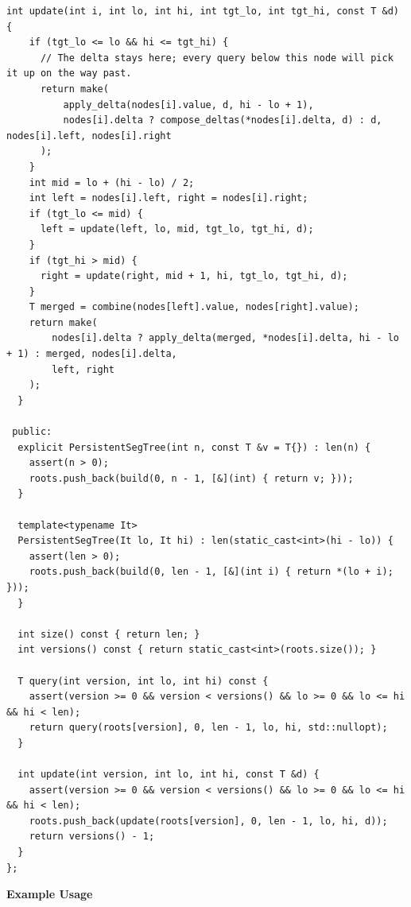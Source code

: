 \begin{lstlisting}[style=cpp]
  int update(int i, int lo, int hi, int tgt_lo, int tgt_hi, const T &d) {
    if (tgt_lo <= lo && hi <= tgt_hi) {
      // The delta stays here; every query below this node will pick it up on the way past.
      return make(
          apply_delta(nodes[i].value, d, hi - lo + 1),
          nodes[i].delta ? compose_deltas(*nodes[i].delta, d) : d, nodes[i].left, nodes[i].right
      );
    }
    int mid = lo + (hi - lo) / 2;
    int left = nodes[i].left, right = nodes[i].right;
    if (tgt_lo <= mid) {
      left = update(left, lo, mid, tgt_lo, tgt_hi, d);
    }
    if (tgt_hi > mid) {
      right = update(right, mid + 1, hi, tgt_lo, tgt_hi, d);
    }
    T merged = combine(nodes[left].value, nodes[right].value);
    return make(
        nodes[i].delta ? apply_delta(merged, *nodes[i].delta, hi - lo + 1) : merged, nodes[i].delta,
        left, right
    );
  }

 public:
  explicit PersistentSegTree(int n, const T &v = T{}) : len(n) {
    assert(n > 0);
    roots.push_back(build(0, n - 1, [&](int) { return v; }));
  }

  template<typename It>
  PersistentSegTree(It lo, It hi) : len(static_cast<int>(hi - lo)) {
    assert(len > 0);
    roots.push_back(build(0, len - 1, [&](int i) { return *(lo + i); }));
  }

  int size() const { return len; }
  int versions() const { return static_cast<int>(roots.size()); }

  T query(int version, int lo, int hi) const {
    assert(version >= 0 && version < versions() && lo >= 0 && lo <= hi && hi < len);
    return query(roots[version], 0, len - 1, lo, hi, std::nullopt);
  }

  int update(int version, int lo, int hi, const T &d) {
    assert(version >= 0 && version < versions() && lo >= 0 && lo <= hi && hi < len);
    roots.push_back(update(roots[version], 0, len - 1, lo, hi, d));
    return versions() - 1;
  }
};
\end{lstlisting}
\textbf{Example Usage}\par
